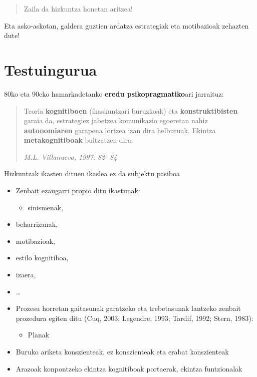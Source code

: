 \documentclass[]{book}
\providecommand{\tightlist}{%
  \setlength{\itemsep}{0pt}\setlength{\parskip}{0pt}}
\begin{document}
\begin{quote}
Zaila da hizkuntza honetan aritzea!
\end{quote}

Eta asko-askotan, galdera guztien ardatza estrategiak eta motibazioak zehazten dute!

\hypertarget{testuingurua-1}{%
\section{Testuingurua}\label{testuingurua-1}}

80ko eta 90eko hamarkadetanko \textbf{eredu psikopragmatiko}ari jarraituz:

\begin{quote}
Teoria \textbf{kognitiboen} (ikaskuntzari buruzkoak) eta \textbf{konstruktibisten} garaia da, estrategiez jabetzea komunikazio egoeretan nahiz \textbf{autonomiaren} garapena lortzea izan dira helburuak. Ekintza \textbf{metakognitiboak} bultzatzen dira.

\emph{M.L. Villanueva, 1997: 82- 84}
\end{quote}

Hizkuntzak ikasten dituen ikaslea ez da subjektu pasiboa

\begin{itemize}
\tightlist
\item
  Zenbait ezaugarri propio ditu ikastunak:

  \begin{itemize}
  \tightlist
  \item
    sinismenak,
  \end{itemize}
\item
  beharrizanak,
\item
  motibazioak,
\item
  estilo kognitiboa,
\item
  izaera,
\item
  \ldots{}
\item
  Prozesu horretan gaitasunak garatzeko eta trebetasunak lantzeko zenbait prozedura egiten ditu (Cuq, 2003; Legendre, 1993; Tardif, 1992; Stern, 1983):

  \begin{itemize}
  \tightlist
  \item
    Planak
  \end{itemize}
\item
  Buruko ariketa konszienteak, ez konszienteak eta erabat konszienteak
\item
  Arazoak konpontzeko ekintza kognitiboak portaerak, ekintza funtzionalak
\end{itemize}
\end{document}
